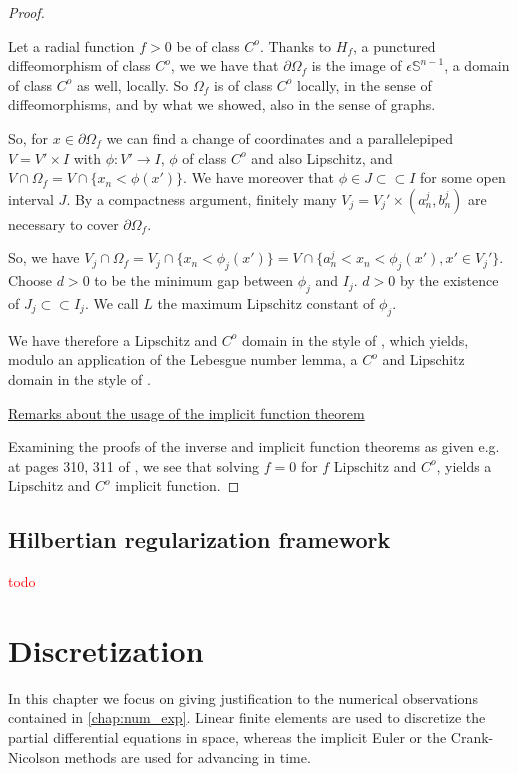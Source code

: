 \documentclass[english,a4paper,9pt,oneside]{scrbook}	%
\theoremstyle{break}
\newenvironment{mproof}[1][\proofname]{%
  \begin{proof}[#1]$ $\par\nobreak\ignorespaces
}{%
  \end{proof}
}
\renewcommand*{\proofname}{Proof}
\theoremstyle{remark}
\newcommand{\mS}{\mathbb{S}^{n-1}}
\newcommand{\cc}{\subset\subset}
\newcommand{\tred}[1]{\textcolor{red}{#1}}
\newcommand{\eps}{\epsilon}
\begin{document}
\begin{mproof}
Let a radial function $f>0$ be of class $C^o$. Thanks to $H_f$, a punctured diffeomorphism of class $C^o$, we we have that $\partial \Omega_f$ is the image of $\eps\mS$, a domain of class $C^o$ as well, locally. So $\Omega_f $ is of class $C^o$ locally, in the sense of diffeomorphisms, and by what we showed, also in the sense of graphs.

So, for $x \in \partial \Omega_f$ we can find a change of coordinates and a parallelepiped $V = V'\times I$ with $\phi: V'\rightarrow I$, $\phi$ of class $C^o$ and also Lipschitz, and $V\cap 	\Omega_f = V\cap \{x_n<\phi(x')\}$. We have moreover that $\phi \in J \cc I$ for some open interval $J$. By a compactness argument, finitely many $V_j = V_j'\times (a_n^j, b_n^j) $ are necessary to cover $\partial \Omega_f$. 

So, we have $V_j \cap \Omega_f = V_j\cap \{x_n<\phi_j(x')\} = V\cap \{a_n^j<x_n<\phi_j(x'), x' \in V_j'\}$. Choose $d>0$ to be the minimum gap between $\phi_j$ and $I_j$. $d>0$ by the existence of $J_j \cc I_j$. We call $L$ the maximum Lipschitz constant of $\phi_j$. 

We have therefore a Lipschitz and $C^o$ domain in the style of \cite{burenkov}, which yields, modulo an application of the Lebesgue number lemma, a $C^o$ and Lipschitz domain in the style of \cite{grisvard}.

\underline{Remarks about the usage of the implicit function theorem}

Examining the proofs of the inverse and implicit function theorems as given e.g. at pages 310, 311 of \cite{gilardi2}, we see that solving $f=0$ for $f$ Lipschitz and $C^o$, yields a Lipschitz and $C^o$ implicit function.

\end{mproof}

\section{Hilbertian regularization framework}

\tred{todo}

\chapter{Discretization}

In this chapter we focus on giving justification to the numerical observations contained in \cref{chap:num_exp}. Linear finite elements are used to discretize the partial differential equations in space, whereas the implicit Euler or the Crank-Nicolson methods are used for advancing in time.
\end{document}

